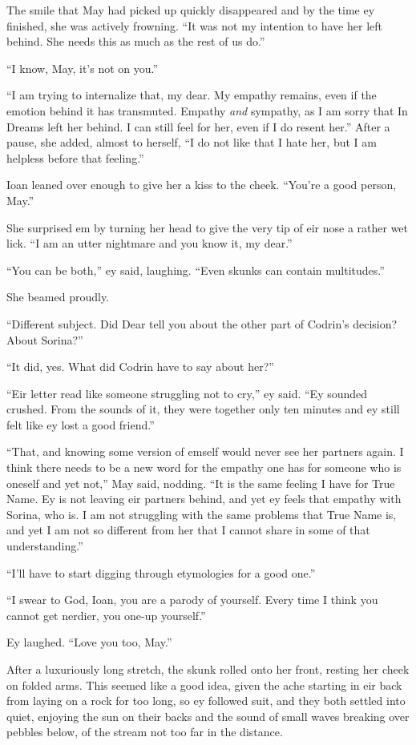 The smile that May had picked up quickly disappeared and by the time ey finished, she was actively frowning. ``It was not my intention to have her left behind. She needs this as much as the rest of us do.''

``I know, May, it's not on you.''

``I am trying to internalize that, my dear. My empathy remains, even if the emotion behind it has transmuted. Empathy \emph{and} sympathy, as I am sorry that In Dreams left her behind. I can still feel for her, even if I do resent her.'' After a pause, she added, almost to herself, ``I do not like that I hate her, but I am helpless before that feeling.''

Ioan leaned over enough to give her a kiss to the cheek. ``You're a good person, May.''

She surprised em by turning her head to give the very tip of eir nose a rather wet lick. ``I am an utter nightmare and you know it, my dear.''

``You can be both,'' ey said, laughing. ``Even skunks can contain multitudes.''

She beamed proudly.

``Different subject. Did Dear tell you about the other part of Codrin's decision? About Sorina?''

``It did, yes. What did Codrin have to say about her?''

``Eir letter read like someone struggling not to cry,'' ey said. ``Ey sounded crushed. From the sounds of it, they were together only ten minutes and ey still felt like ey lost a good friend.''

``That, and knowing some version of emself would never see her partners again. I think there needs to be a new word for the empathy one has for someone who is oneself and yet not,'' May said, nodding. ``It is the same feeling I have for True Name. Ey is not leaving eir partners behind, and yet ey feels that empathy with Sorina, who is. I am not struggling with the same problems that True Name is, and yet I am not so different from her that I cannot share in some of that understanding.''

``I'll have to start digging through etymologies for a good one.''

``I swear to God, Ioan, you are a parody of yourself. Every time I think you cannot get nerdier, you one-up yourself.''

Ey laughed. ``Love you too, May.''

After a luxuriously long stretch, the skunk rolled onto her front, resting her cheek on folded arms. This seemed like a good idea, given the ache starting in eir back from laying on a rock for too long, so ey followed suit, and they both settled into quiet, enjoying the sun on their backs and the sound of small waves breaking over pebbles below, of the stream not too far in the distance.

